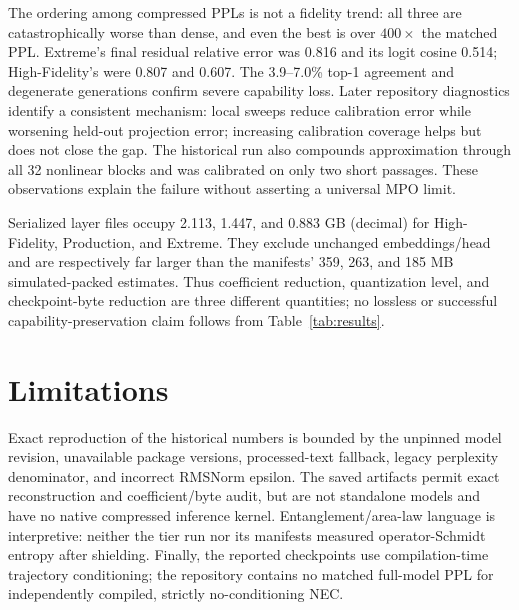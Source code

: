 \documentclass[10pt,twocolumn]{article}
\begin{document}
The ordering among compressed PPLs is not a fidelity trend: all three are catastrophically worse than dense, and even the best is over $400\times$ the matched PPL.  Extreme's final residual relative error was 0.816 and its logit cosine 0.514; High-Fidelity's were 0.807 and 0.607.  The 3.9--7.0\% top-1 agreement and degenerate generations confirm severe capability loss.  Later repository diagnostics identify a consistent mechanism: local sweeps reduce calibration error while worsening held-out projection error; increasing calibration coverage helps but does not close the gap.  The historical run also compounds approximation through all 32 nonlinear blocks and was calibrated on only two short passages.  These observations explain the failure without asserting a universal MPO limit.

Serialized layer files occupy 2.113, 1.447, and 0.883 GB (decimal) for High-Fidelity, Production, and Extreme.  They exclude unchanged embeddings/head and are respectively far larger than the manifests' 359, 263, and 185 MB simulated-packed estimates.  Thus coefficient reduction, quantization level, and checkpoint-byte reduction are three different quantities; no lossless or successful capability-preservation claim follows from Table~\ref{tab:results}.

\section{Limitations}
Exact reproduction of the historical numbers is bounded by the unpinned model revision, unavailable package versions, processed-text fallback, legacy perplexity denominator, and incorrect RMSNorm epsilon.  The saved artifacts permit exact reconstruction and coefficient/byte audit, but are not standalone models and have no native compressed inference kernel.  Entanglement/area-law language is interpretive: neither the tier run nor its manifests measured operator-Schmidt entropy after shielding.  Finally, the reported checkpoints use compilation-time trajectory conditioning; the repository contains no matched full-model PPL for independently compiled, strictly no-conditioning NEC.
\end{document}
